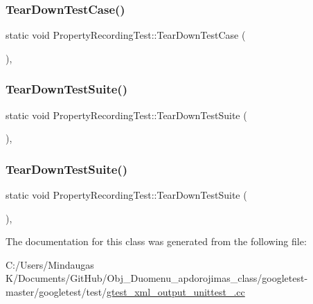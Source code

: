 \subsubsection{\texorpdfstring{TearDownTestCase()}{TearDownTestCase()}}
{\footnotesize\ttfamily static void Property\+Recording\+Test\+::\+Tear\+Down\+Test\+Case (\begin{DoxyParamCaption}{ }\end{DoxyParamCaption})\hspace{0.3cm}{\ttfamily [inline]}, {\ttfamily [static]}}

\mbox{\label{class_property_recording_test_ad6a000f710b6ecc7ee06a74ca722668b}} 
\subsubsection{\texorpdfstring{TearDownTestSuite()}{TearDownTestSuite()}\hspace{0.1cm}{\footnotesize\ttfamily [1/2]}}
{\footnotesize\ttfamily static void Property\+Recording\+Test\+::\+Tear\+Down\+Test\+Suite (\begin{DoxyParamCaption}{ }\end{DoxyParamCaption})\hspace{0.3cm}{\ttfamily [inline]}, {\ttfamily [static]}}

\mbox{\label{class_property_recording_test_ad6a000f710b6ecc7ee06a74ca722668b}} 
\subsubsection{\texorpdfstring{TearDownTestSuite()}{TearDownTestSuite()}\hspace{0.1cm}{\footnotesize\ttfamily [2/2]}}
{\footnotesize\ttfamily static void Property\+Recording\+Test\+::\+Tear\+Down\+Test\+Suite (\begin{DoxyParamCaption}{ }\end{DoxyParamCaption})\hspace{0.3cm}{\ttfamily [inline]}, {\ttfamily [static]}}



The documentation for this class was generated from the following file\+:\begin{DoxyCompactItemize}
\item 
C\+:/\+Users/\+Mindaugas K/\+Documents/\+Git\+Hub/\+Obj\+\_\+\+Duomenu\+\_\+apdorojimas\+\_\+class/googletest-\/master/googletest/test/\mbox{\hyperlink{googletest-master_2googletest_2test_2gtest__xml__output__unittest___8cc}{gtest\+\_\+xml\+\_\+output\+\_\+unittest\+\_\+.\+cc}}\end{DoxyCompactItemize}
